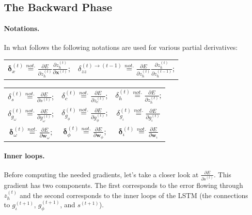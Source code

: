 \documentclass[11pt]{article}
\begin{document}
\subsection{The Backward Phase}

\paragraph{Notations.} In what follows the following notations are used for various partial derivatives:

\begin{center}
\begin{tabular}{c c}
    $\boldsymbol{\delta}_{x}^{(t)} \overset{not.}{=} \displaystyle\frac{\partial E}{\partial z_h^{(t)}}\displaystyle\frac{\partial z_h^{(t)}} {\partial \mathbf{x}^{(t)}}$; &
    $\delta_{zz}^{(t)\rightarrow(t-1)} \overset{not.}{=} \displaystyle\frac{\partial E}{\partial z_h^{(t)}}\displaystyle\frac{\partial z_h^{(t)}} {\partial z_h^{(t-1)}}$; \\[20pt]
\end{tabular}
\begin{tabular}{c c c}
    $\delta_{s}^{(t)} \overset{not.}{=} \displaystyle\frac{\partial E}{\partial s^{(t)}}$; &
    $\delta_{c}^{(t)} \overset{not.}{=} \displaystyle\frac{\partial E}{\partial z_c^{(t)}}$; &
    $\delta_{h}^{(t)} \overset{not.}{=} \displaystyle\frac{\partial E}{\partial z_h^{(t)}}$;  \\[20pt]
    $\delta_{g_{\omega}}^{(t)} \overset{not.}{=} \displaystyle\frac{\partial E}{\partial g_{\omega}^{(t)}}$; &
    $\delta_{g_{\phi}}^{(t)} \overset{not.}{=} \displaystyle\frac{\partial E}{\partial g_{\phi}^{(t)}}$; &
    $\delta_{g_{\iota}}^{(t)} \overset{not.}{=} \displaystyle\frac{\partial E}{\partial g_{\iota}^{(t)}}$ \\[20pt]
    $\boldsymbol{\delta}_{\omega}^{(t)} \overset{not.}{=} \displaystyle\frac{\partial E}{\partial \mathbf{w}_{\omega}}$; &
    $\boldsymbol{\delta}_{\phi}^{(t)} \overset{not.}{=} \displaystyle\frac{\partial E}{\partial \mathbf{w}_{\phi}}$; &
    $\boldsymbol{\delta}_{\iota}^{(t)} \overset{not.}{=} \displaystyle\frac{\partial E}{\partial \mathbf{w}_{\iota}}$
\end{tabular}
\end{center}

\paragraph{Inner loops.} Before computing the needed gradients, let's take a closer look at $\frac{\partial E}{\partial s^{(t)}}$. This gradient has two components. The first corresponds to the error flowing through $z_h^{(t)}$ and the second corresponds to the inner loops of the LSTM (the connections to $g_{\iota}^{(t+1)}$, $g_{\phi}^{(t+1)}$, and $s^{(t+1)}$).
\end{document}
